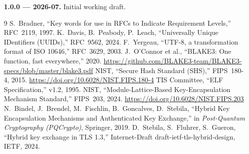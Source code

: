 \documentclass[11pt,a4paper]{article}
\begin{document}
\noindent\textbf{1.0.0 --- 2026-07.} Initial working draft.

\clearpage
\begin{thebibliography}{9}
 S.~Bradner, ``Key words for use in RFCs to Indicate Requirement Levels,'' RFC~2119, 1997.
 K.~Davis, B.~Peabody, P.~Leach, ``Universally Unique IDentifiers (UUIDs),'' RFC~9562, 2024.
 F.~Yergeau, ``UTF-8, a transformation format of ISO 10646,'' RFC~3629, 2003.
 J.~O'Connor et al., ``BLAKE3: One function, fast everywhere,'' 2020. \url{https://github.com/BLAKE3-team/BLAKE3-specs/blob/master/blake3.pdf}
 NIST, ``Secure Hash Standard (SHS),'' FIPS~180-4, 2015. \url{https://doi.org/10.6028/NIST.FIPS.180-4}
 TIS Committee, ``ELF Specification,'' v1.2, 1995.
 NIST, ``Module-Lattice-Based Key-Encapsulation Mechanism Standard,'' FIPS~203, 2024. \url{https://doi.org/10.6028/NIST.FIPS.203}
 N.~Bindel, J.~Brendel, M.~Fischlin, B.~Goncalves, D.~Stebila, ``Hybrid Key Encapsulation Mechanisms and Authenticated Key Exchange,'' in \emph{Post-Quantum Cryptography (PQCrypto)}, Springer, 2019.
 D.~Stebila, S.~Fluhrer, S.~Gueron, ``Hybrid key exchange in TLS 1.3,'' Internet-Draft draft-ietf-tls-hybrid-design, IETF, 2024.
\end{thebibliography}
\end{document}
